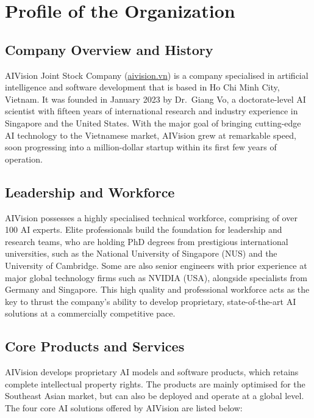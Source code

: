\chapter{Profile of the Organization}
\label{chap:org}

\section{Company Overview and History}

AIVision Joint Stock Company (\url{aivision.vn}) is a company specialised in artificial intelligence and software development that is based in Ho Chi Minh City, Vietnam. It was founded in January 2023 by Dr.\ Giang Vo, a doctorate-level AI scientist with fifteen years of international research and industry experience in Singapore and the United States. With the major goal of bringing cutting-edge AI technology to the Vietnamese market, AIVision grew at remarkable speed, soon progressing into a million-dollar startup within its first few years of operation.

\section{Leadership and Workforce}

AIVision possesses a highly specialised technical workforce, comprising of over 100 AI experts. Elite professionals build the foundation for leadership and research teams, who are holding PhD degrees from prestigious international universities, such as the National University of Singapore (NUS) and the University of Cambridge. Some are also senior engineers with prior experience at major global technology firms such as NVIDIA (USA), alongside specialists from Germany and Singapore. This high quality and professional workforce acts as the key to thrust the company's ability to develop proprietary, state-of-the-art AI solutions at a commercially competitive pace.

\section{Core Products and Services}

AIVision develops proprietary AI models and software products, which retains complete intellectual property rights. The products are mainly optimised for the Southeast Asian market, but can also be deployed and operate at a global level. The four core AI solutions offered by AIVision are listed below:

